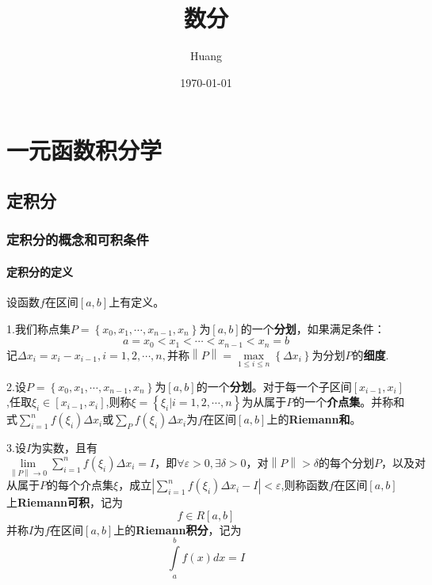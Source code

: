 \documentclass[lang=cn,10pt]{elegantbook}
\title{数分}
\author{ Huang}
\date{\today}
\begin{document}
	
	\maketitle
	\frontmatter
	
	\tableofcontents
	
	\mainmatter
\chapter{一元函数积分学}
\section{定积分}
\subsection{定积分的概念和可积条件}
\subsubsection{定积分的定义}

设函数$f$在区间$[a,b]$上有定义。

1.我们称点集$P=\left\{ x_0,x_1,\cdots ,x_{n-1},x_n \right\} $为$[a,b]$的一个\textbf{分划}，如果满足条件：
\begin{equation*}
	a=x_{0}<x_{1}<\cdots<x_{n-1}<x_{n}=b
\end{equation*}
$\text{记}\varDelta x_i=x_i-x_{i-1},i=1,2,\cdots ,n,\text{并称}\left\| P \right\| =\underset{1\leqslant i\leqslant n}{\max}\left\{ \varDelta x_i \right\} \text{为分划}P\text{的}$\textbf{细度}.


2.设$P=\left\{ x_0,x_1,\cdots ,x_{n-1},x_n \right\} $为$[a,b]$的一个\textbf{分划}。对于每一个子区间$[x_{i-1},x_{i}]$,任取$\xi_{i}\in[x_{i-1},x_{i}]$,则称$\xi =\left\{ \xi _i|i=1,2,\cdots ,n \right\} $为从属于$P $的一个\textbf{介点集}。并称和式$\sum_{i=1}^n{f\left( \xi _i \right)}\varDelta x_i\text{或}\sum_P{f\left( \xi _i \right) \varDelta x_i}$为$f$在区间$[a,b]$上的\textbf{Riemann和}。

3.设$I$为实数，且有$\underset{\left\| P \right\| \rightarrow 0}{\lim}\sum_{i=1}^n{f\left( \xi _i \right)}\varDelta x_i=I\text{，即}\forall \varepsilon >0,\exists \delta >0\text{，对}\left\| P \right\| >\delta \text{的每个分划}P\text{，以及对}
$从属于$P$的每个介点集$\xi$，成立$|\sum_{i=1}^n{f\left( \xi _i \right)}\varDelta x_i-I|<\varepsilon$,则称函数$f$在区间$[a,b]$上\textbf{Riemann可积}，记为
\begin{equation*}
	f\in R[a,b]
\end{equation*}
并称$I$为$f$在区间$[a,b]$上的\textbf{Riemann积分}，记为
\begin{equation*}
	\int\limits_a^b{f\left( x \right) dx}=I
\end{equation*}
\end{document}
